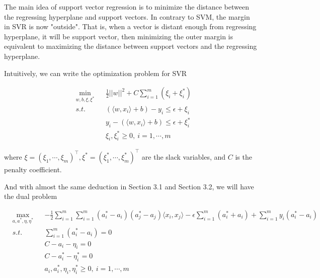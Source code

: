 \documentclass[a4paper]{report}
\begin{document}
The main idea of support vector regression\cite{drucker1997support} is to minimize the distance between the regressing hyperplane and support vectors. In contrary to SVM, the margin in SVR is now "outside". That is, when a vector is distant enough from regressing hyperplane, it will be support vector, then minimizing the outer margin is equivalent to maximizing the distance between support vectors and the regressing hyperplane.

Intuitively, we can write the optimization problem for SVR

\begin{align*}
    &\min_{w,b,\xi, \xi^*} && \frac{1}{2}||w||^2 +C\sum_{i=1}^m (\xi_i+\xi_i^*) \\
    &s.t. && (\langle w,x_i\rangle +b)-y_i\leq \epsilon +\xi_i \\
    & && y_i-(\langle w,x_i\rangle +b)\leq \epsilon +\xi_i^* \\
    & && \xi_i,\xi_i^*\geq 0,\ i=1,\cdots,m
\end{align*}

where $\xi=(\xi_1,\cdots,\xi_m)^\top,\xi^*=(\xi_1^*,\cdots,\xi_m^*)^\top$ are the slack variables, and $C$ is the penalty coefficient.

And with almost the same deduction in Section 3.1 and Section 3.2, we will have the dual problem

\begin{align*}
    &\max_{a,a^*,\eta,\eta^*} && -\frac{1}{2}\sum_{i=1}^m\sum_{i=1}^m(a_i^*-a_i)(a_j^*-a_j)\langle x_i,x_j\rangle -\epsilon \sum_{i=1}^m (a_i^*+a_i) + \sum_{i=1}^my_i(a_i^*-a_i) \\
    &s.t. &&\sum_{i=1}^m(a_i^*-a_i)=0 \\
    & &&C-a_i-\eta_i=0 \\
    & &&C-a_i^*-\eta_i^*=0 \\
    & && a_i,a_i^*,\eta_i,\eta_i^*\geq 0,\ i=1,\cdots,m
\end{align*}

\end{document}
